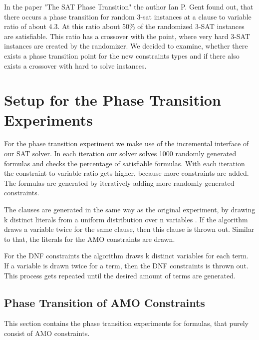 In the paper "The SAT Phase Transition" \cite{gent1994sat} the author Ian P. Gent found out, that there occurs a phase transition for random 3-sat instances at a clause to variable ratio of about 4.3. At this ratio about 50\% of the randomized 3-SAT instances are satisfiable. This ratio has a crossover with the point, where very hard 3-SAT instances are created by the randomizer. We decided to examine, whether there exists a phase transition point for the new constraints types and if there also exists a crossover with hard to solve instances.

\section{Setup for the Phase Transition Experiments}

For the phase transition experiment we make use of the incremental interface of our SAT solver. In each iteration our solver solves 1000 randomly generated formulas and checks the percentage of satisfiable formulas. With each iteration the constraint to variable ratio gets higher, because more constraints are added. The formulas are generated by iteratively adding more randomly generated constraints.

The clauses are generated in the same way as the original experiment, by drawing k distinct literals from a uniform distribution over n variables \cite{gent1994sat}. If the algorithm draws a variable twice for the same clause, then this clause is thrown out. Similar to that, the literals for the AMO constraints are drawn.

For the DNF constraints the algorithm draws k distinct variables for each term. If a variable is drawn twice for a term, then the DNF constraints is thrown out. This process gets repeated until the desired amount of terms are generated.

\subsection{Phase Transition of AMO Constraints}

This section contains the phase transition experiments for formulas, that purely consist of AMO constraints.



